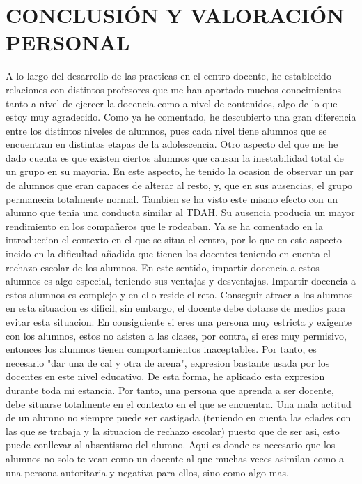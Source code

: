 \documentclass[spanish,12pt, a4paper,twoside]{paper}
\let\oldsection\section
\def\section{\cleardoublepage\oldsection}
\begin{document}
\section{CONCLUSIÓN Y VALORACIÓN PERSONAL} %
\justify
A lo largo del desarrollo de las practicas en el centro docente, he establecido relaciones con distintos profesores que me han aportado muchos conocimientos tanto a nivel de ejercer la docencia como a nivel de contenidos, algo de lo que estoy muy agradecido. Como ya he comentado, he descubierto una gran diferencia entre los distintos niveles de alumnos, pues cada nivel tiene alumnos que se encuentran en distintas etapas de la adolescencia. Otro aspecto del que me he dado cuenta es que existen ciertos alumnos que causan la inestabilidad total de un grupo en su mayoria. En este aspecto, he tenido la ocasion de observar un par de alumnos que eran capaces de alterar al resto, y, que en sus ausencias, el grupo permanecia totalmente normal. Tambien se ha visto este mismo efecto con un alumno que tenia una conducta similar al TDAH. Su ausencia producia un mayor rendimiento en los compañeros que le rodeaban.
\justify
 Ya se ha comentado en la introduccion el contexto en el que se situa el centro, por lo que en este aspecto incido en la dificultad añadida que tienen los docentes teniendo en cuenta el rechazo escolar de los alumnos. En este sentido, impartir docencia a estos alumnos es algo especial, teniendo sus ventajas y desventajas. Impartir docencia a estos alumnos es complejo y en ello reside el reto. Conseguir atraer a los alumnos en esta situacion es dificil, sin embargo, el docente debe dotarse de medios para evitar esta situacion. 
\justify
En consiguiente si eres una persona muy estricta y exigente con los alumnos, estos no asisten a las clases, por contra, si eres muy permisivo, entonces los alumnos tienen comportamientos inaceptables. Por tanto, es necesario "dar una de cal y otra de arena", expresion bastante usada por los docentes en este nivel educativo. De esta forma, he aplicado esta expresion durante toda mi estancia. 
\justify
Por tanto, una persona que aprenda a ser docente, debe situarse totalmente en el contexto en el que se encuentra. Una mala actitud de un alumno no siempre puede ser castigada (teniendo en cuenta las edades con las que se trabaja y la situacion de rechazo escolar) puesto que de ser asi, esto puede conllevar al absentismo del alumno. Aqui es donde es necesario que los alumnos no solo te vean como un docente al que muchas veces asimilan como a una persona autoritaria y negativa para ellos, sino como algo mas. 
\end{document}
